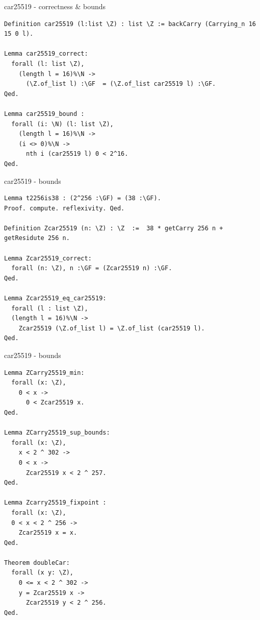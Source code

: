\documentclass[8pt]{beamer}
\begin{document}
%
%

\begin{frame}[fragile]{car25519 - correctness \& bounds}
  \begin{center}
\begin{lstlisting}[language=Coq, caption=car25519 | Proofs of correctness, label=cod:languageC171]
Definition car25519 (l:list \Z) : list \Z := backCarry (Carrying_n 16 15 0 l).

Lemma car25519_correct:
  forall (l: list \Z),
    (length l = 16)%\N ->
      (\Z.of_list l) :\GF  = (\Z.of_list car25519 l) :\GF.
Qed.

Lemma car25519_bound :
  forall (i: \N) (l: list \Z),
    (length l = 16)%\N ->
    (i <> 0)%\N ->
      nth i (car25519 l) 0 < 2^16.
Qed.
\end{lstlisting}
  \end{center}
\end{frame}



%
%

\begin{frame}[fragile]{car25519 - bounds}
  \begin{center}
\begin{lstlisting}[language=Coq, caption=car25519, label=cod:languageC181]
Lemma t2256is38 : (2^256 :\GF) = (38 :\GF).
Proof. compute. reflexivity. Qed.

Definition Zcar25519 (n: \Z) : \Z  :=  38 * getCarry 256 n +  getResidute 256 n.

Lemma Zcar25519_correct:
  forall (n: \Z), n :\GF = (Zcar25519 n) :\GF.
Qed.

Lemma Zcar25519_eq_car25519:
  forall (l : list \Z),
  (length l = 16)%\N ->
    Zcar25519 (\Z.of_list l) = \Z.of_list (car25519 l).
Qed.
\end{lstlisting}

  \end{center}
\end{frame}


%
%

\begin{frame}[fragile]{car25519 - bounds}
  \begin{center}
\begin{lstlisting}[language=Coq, caption=car25519, label=cod:languageC191]
Lemma ZCarry25519_min:
  forall (x: \Z),
    0 < x ->
      0 < Zcar25519 x.
Qed.

Lemma ZCarry25519_sup_bounds:
  forall (x: \Z),
    x < 2 ^ 302 ->
    0 < x ->
      Zcar25519 x < 2 ^ 257.
Qed.

Lemma Zcarry25519_fixpoint :
  forall (x: \Z),
  0 < x < 2 ^ 256 ->
    Zcar25519 x = x.
Qed.

Theorem doubleCar:
  forall (x y: \Z),
    0 <= x < 2 ^ 302 ->
    y = Zcar25519 x ->
      Zcar25519 y < 2 ^ 256.
Qed.
\end{lstlisting}

  \end{center}
\end{frame}
\end{document}
